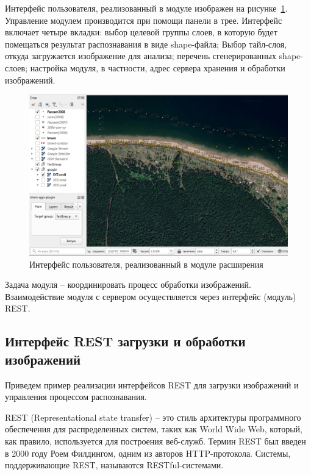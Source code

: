 \documentclass[732,14pt,final]{studrep}
\begin{document}
Интерфейс пользователя, реализованный в модуле изображен на рисунке~\ref{fig:plugin-ui}. Управление модулем производится при помощи панели в трее. Интерфейс включает четыре вкладки: выбор целевой группы слоев, в которую будет помещаться результат распознавания в виде shape-файла; Выбор тайл-слоя, откуда загружается изображение для анализа; перечень сгенерированных shape-слоев; настройка модуля, в частности, адрес сервера хранения и обработки изображений.
\begin{center}
  \begin{figure}[htp]
    \includegraphics[width=\linewidth]{pics/plugin-ui.png}
    \caption{Интерфейс пользователя, реализованный в модуле расширения}
    \label{fig:plugin-ui}
  \end{figure}
\end{center}

Задача модуля -- координировать процесс обработки изображений. Взаимодействие модуля с сервером осуществляется через интерфейс (модуль) REST.

\subsection{Интерфейс REST загрузки и обработки изображений}

Приведем пример реализации интерфейсов REST для загрузки изображений и управления процессом распознавания.

REST (Representational state transfer) – это стиль архитектуры программного обеспечения для распределенных систем, таких как World Wide Web, который, как правило, используется для построения веб-служб. Термин REST был введен в 2000 году Роем Филдингом, одним из авторов HTTP-протокола. Системы, поддерживающие REST, называются RESTful-системами.
\end{document}
